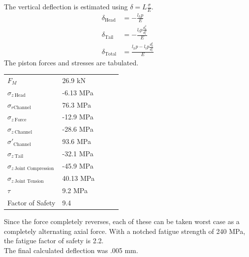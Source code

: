 \documentclass[10pt,a4paper]{article}
\begin{document}
	The vertical deflection is estimated using $\delta = L \frac{\sigma}{E}$.
	\begin{align*}
		\delta_{\text{Head}} &= - \frac{l_h p}{E}\\ 
		\delta_{\text{Tail}} &= - \frac{l_t p \frac{d_h^2}{d_t^2}}{E}\\ 
		\delta_{\text{Total}} &=  \frac{l_h p -l_t p \frac{d_h^2}{d_t^2}}{E}
	\end{align*}
	The piston forces and stresses are tabulated.
\begin{table}[H]
\begin{tabular}{lllll}
 $F_M$ & 26.9 kN \\
 $\sigma_{z\ \text{Head}}$& -6.13 MPa \\
 $\sigma_{r \text{Channel}}$ & 76.3 MPa \\
 $\sigma_{z\ \text{Force}}$ & -12.9 MPa \\
 $\sigma_{z\ \text{Channel}}$& -28.6 MPa \\
 $\sigma'_{\text{Channel}}$ &  93.6 MPa \\
 $\sigma_{z\ \text{Tail}}$&  -32.1 MPa \\
 $\sigma_{z\ \text{Joint Compression}}$ & -45.9 MPa\\
 $\sigma_{z\ \text{Joint Tension}}$ & 40.13 MPa\\
 $\tau$ & 9.2 MPa\\
 Factor of Safety & 9.4
\end{tabular}
\end{table}
Since the force completely reverses, each of these can be taken worst case as a completely alternating axial force. With a notched fatigue strength of 240 MPa, the fatigue factor of safety is 2.2.\\
The final calculated deflection was .005 mm.
\newpage
\end{document}
